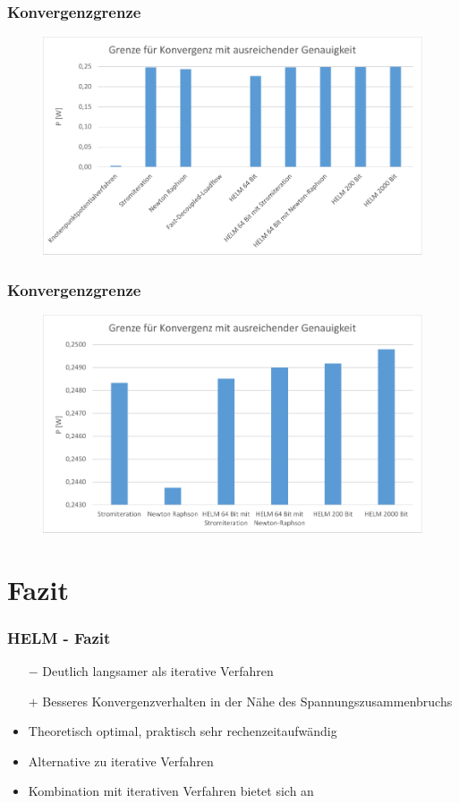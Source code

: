 \documentclass[hyperref={pdfpagelabels=false},compress]{beamer}
\begin{document}
\begin{frame}
	\frametitle{Konvergenzgrenze}
	\begin{figure}
		\centering
		\includegraphics[scale=0.6]{pictures/convergence_border_1}
	\end{figure}
\end{frame}

\begin{frame}
	\frametitle{Konvergenzgrenze}
	\begin{figure}
		\centering
		\includegraphics[scale=0.6]{pictures/convergence_border_2}
	\end{figure}
\end{frame}

\section{Fazit}
\begin{frame}
	\frametitle{HELM - Fazit}
	\begin{itemize}
		\item[$-$] Deutlich langsamer als iterative Verfahren
		\item[$+$] Besseres Konvergenzverhalten in der Nähe des Spannungszusammenbruchs 
	\end{itemize}
	
	\begin{itemize}
		\item Theoretisch optimal, praktisch sehr rechenzeitaufwändig
		\item Alternative zu iterative Verfahren
		\item Kombination mit iterativen Verfahren bietet sich an
	\end{itemize}
\end{frame}
\end{document}
